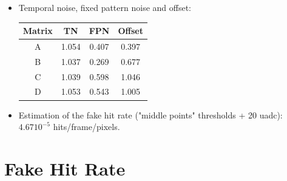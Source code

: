 \documentclass[a4papper, 10pt]{article}
\begin{document}
\begin{itemize}
    \item Temporal noise, fixed pattern noise and offset:

            \begin{center}
              \begin{tabular}{ c c c c }
                \hline %
         \rowcolor{light-gray}         Matrix  &  TN   &  FPN  &  Offset  \tabularnewline
                \hline %
                \hline %
                    A     & 1.054 & 0.407 &  0.397    \tabularnewline
                \hline %
                    B     & 1.037 & 0.269 & 0.677   \tabularnewline
                \hline %
                    C     & 1.039 & 0.598 & 1.046   \tabularnewline
                \hline %
                    D     & 1.053 & 0.543 &  1.005    \tabularnewline
                \hline %
              \end{tabular}
            \end{center}
    
    \item Estimation of the fake hit rate ("middle points" thresholds + 20 uadc): $4.67 10^{-5}$ hits/frame/pixels. 
    
    \end{itemize}

  \section{Fake Hit Rate}
\end{document}
